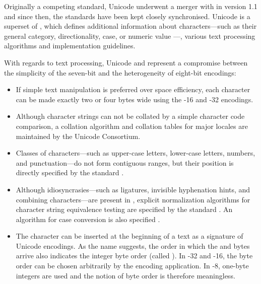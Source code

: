 \documentclass{book}
\begin{document}

Originally a competing standard, Unicode underwent a merger with 
in version 1.1 and since then, the standards have been kept closely
synchronised. Unicode is a superset of , which defines additional
information about  characters---such as their general category,
directionality, case, or numeric value \cite[sec.\,3.5, ch.\,4]{unicode15}---,
various text processing algorithms and implementation guidelines.


With regards to text processing, Unicode and  represent a
compromise between the simplicity of the seven-bit  and the
heterogeneity of eight-bit encodings:
\begin{itemize}
  \item If simple text manipulation is preferred over space efficiency, each
    character can be made exactly two or four bytes wide using the
    -16 and -32 encodings.
  \item Although character strings can not be collated by a simple character
    code comparison, a collation algorithm \cite{unicode15:collation} and
    collation tables for major locales \cite{unicode15:cldr} are maintained by
    the Unicode Consortium.
  \item Classes of characters---such as upper-case letters, lower-case letters,
    numbers, and punctuation---do not form contiguous ranges, but their position
    is directly specified by the standard \cite[sec.\,4.5]{unicode15}.
  \item Although idiosyncrasies---such as ligatures, invisible hyphenation
    hints, and combining characters---are present in , explicit
    normalization algorithms for character string equivalence testing are
    specified by the standard \cite[sec.\,2.12]{unicode15}. An algorithm
    for case conversion is also specified \cite[sec.\,3.13]{unicode15}.
  \item The  character can be inserted at the
    beginning of a text as a signature of Unicode encodings. As the name
    suggests, the order in which the  and  bytes arrive also
    indicates the integer byte order (called ). In
    -32 and -16, the byte order can be chosen
    arbitrarily by the encoding application. In -8, one-byte
    integers are used and the notion of byte order is therefore meaningless.
\end{itemize}
\end{document}
